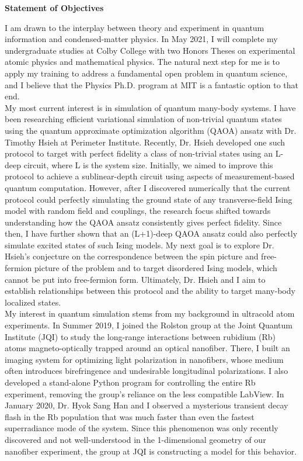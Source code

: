 \documentclass[12pt]{article}
\begin{document}
\begin{center}
	\textbf{Statement of Objectives}
\end{center}
I am drawn to the interplay between theory and experiment in quantum information and condensed-matter physics. In May 2021, I will complete my undergraduate studies at Colby College with two Honors Theses on experimental atomic physics and mathematical physics. The natural next step for me is to apply my training to address a fundamental open problem in quantum science, and I believe that the Physics Ph.D. program at MIT is a fantastic option to that end.  \\ 

My most current interest is in simulation of quantum many-body systems. I have been researching efficient variational simulation of non-trivial quantum states using the quantum approximate optimization algorithm (QAOA) ansatz with Dr. Timothy Hsieh at Perimeter Institute. Recently, Dr. Hsieh developed one such protocol to target with perfect fidelity a class of non-trivial states using an L-deep circuit, where L is the system size. Initially, we aimed to improve this protocol to achieve a sublinear-depth circuit using aspects of measurement-based quantum computation. However, after I discovered numerically that the current protocol could perfectly simulating the ground state of any transverse-field Ising model with random field and couplings, the research focus shifted towards understanding how the QAOA ansatz consistently gives perfect fidelity. Since then, I have further shown that an (L+1)-deep QAOA ansatz could also perfectly simulate excited states of such Ising models. My next goal is to explore Dr. Hsieh's conjecture on the correspondence between the spin picture and free-fermion picture of the problem and to target disordered Ising models, which cannot be put into free-fermion form. Ultimately, Dr. Hsieh and I aim to establish relationships between this protocol and the ability to target many-body localized states.\\

My interest in quantum simulation stems from my background in ultracold atom experiments. In Summer 2019, I joined the Rolston group at the Joint Quantum Institute (JQI) to study the long-range interactions between rubidium (Rb) atoms magneto-optically trapped around an optical nanofiber. There, I built an imaging system for optimizing light polarization in nanofibers, whose medium often introduces birefringence and undesirable longitudinal polarizations. I also developed a stand-alone Python program for controlling the entire Rb experiment, removing the group's reliance on the less compatible LabView. In January 2020, Dr. Hyok Sang Han and I observed a mysterious transient decay flash in the Rb population that was much faster than even the fastest superradiance mode of the system. Since this phenomenon was only recently discovered and not well-understood in the 1-dimensional geometry of our nanofiber experiment, the group at JQI is constructing a model for this behavior.   \\ 
\end{document}
